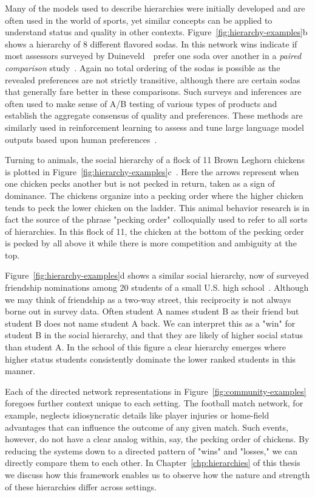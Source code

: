 Many of the models used to describe hierarchies were initially developed and are often used in the world of sports, yet similar concepts can be applied to understand status and quality in other contexts. Figure~\ref{fig:hierarchy-examples}b shows a hierarchy of 8 different flavored sodas. In this network wins indicate if most assessors surveyed by Duineveld~\etal~prefer one soda over another in a \emph{paired comparison} study~\cite{DAK00}. Again no total ordering of the sodas is possible as the revealed preferences are not strictly transitive, although there are certain sodas that generally fare better in these comparisons. Such surveys and inferences are often used to make sense of A/B testing of various types of products and establish the aggregate consensus of quality and preferences. These methods are similarly used in reinforcement learning to assess and tune large language model outputs based upon human preferences~\cite{CLBMLA17}.

Turning to animals, the social hierarchy of a flock of 11 Brown Leghorn chickens is plotted in Figure~\ref{fig:hierarchy-examples}c~\cite{MA34}. Here the arrows represent when one chicken pecks another but is not pecked in return, taken as a sign of dominance. The chickens organize into a pecking order where the higher chicken tends to peck the lower chicken on the ladder. This animal behavior research is in fact the source of the phrase "pecking order" colloquially used to refer to all sorts of hierarchies. In this flock of 11, the chicken at the bottom of the pecking order is pecked by all above it while there is more competition and ambiguity at the top. 

Figure~\ref{fig:hierarchy-examples}d shows a similar social hierarchy, now of surveyed friendship nominations among 20 students of a small U.S. high school~\cite{AddHealth}. Although we may think of friendship as a two-way street, this reciprocity is not always borne out in survey data. Often student A names student B as their friend but student B does not name student A back. We can interpret this as a "win" for student B in the social hierarchy, and that they are likely of higher social status than student A. In the school of this figure a clear hierarchy emerges where higher status students consistently dominate the lower ranked students in this manner. 

Each of the directed network representations in Figure~\ref{fig:community-examples} foregoes further context unique to each setting. The football match network, for example, neglects idiosyncratic details like player injuries or home-field advantages that can influence the outcome of any given match. Such events, however, do not have a clear analog within, say, the pecking order of chickens. By reducing the systems down to a directed pattern of "wins" and "losses," we can directly compare them to each other. In Chapter~\ref{chp:hierarchies} of this thesis we discuss how this framework enables us to observe how the nature and strength of these hierarchies differ across settings.